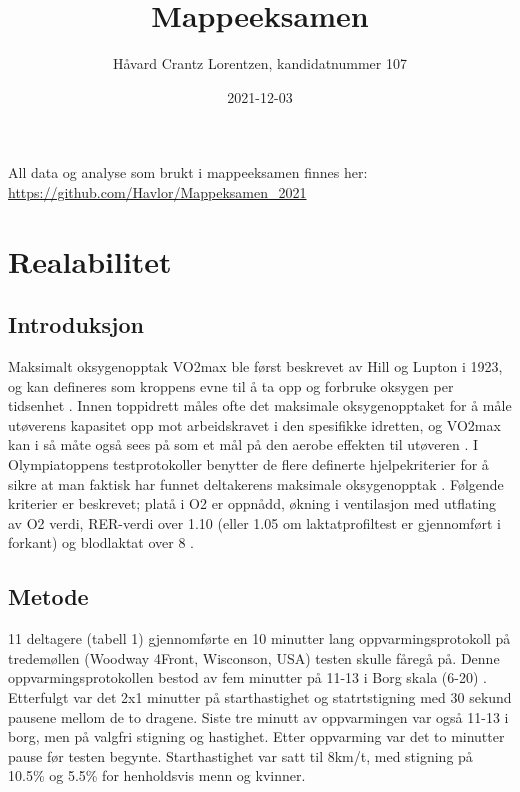\documentclass[
]{book}
\title{Mappeeksamen}
\author{Håvard Crantz Lorentzen, kandidatnummer 107}
\date{2021-12-03}
\begin{document}
\maketitle

{
\setcounter{tocdepth}{1}
\tableofcontents
}
All data og analyse som brukt i mappeeksamen finnes her: \url{https://github.com/Havlor/Mappeksamen_2021}

\hypertarget{realabilitet}{%
\chapter{Realabilitet}\label{realabilitet}}

\hypertarget{introduksjon}{%
\section{Introduksjon}\label{introduksjon}}

Maksimalt oksygenopptak VO2max ble først beskrevet av Hill og Lupton i 1923, og kan defineres som kroppens evne til å ta opp og forbruke oksygen per tidsenhet \citep{bassett2000, hill1923}. Innen toppidrett måles ofte det maksimale oksygenopptaket for å måle utøverens kapasitet opp mot arbeidskravet i den spesifikke idretten, og VO2max kan i så måte også sees på som et mål på den aerobe effekten til utøveren \citep{bassett2000}. I Olympiatoppens testprotokoller benytter de flere definerte hjelpekriterier for å sikre at man faktisk har funnet deltakerens maksimale oksygenopptak \citep{tønnessen2017}. Følgende kriterier er beskrevet; platå i O2 er oppnådd, økning i ventilasjon med utflating av O2 verdi, RER-verdi over 1.10 (eller 1.05 om laktatprofiltest er gjennomført i forkant) og blodlaktat over 8 \citep{tønnessen2017}.

\hypertarget{metode}{%
\section{Metode}\label{metode}}

11 deltagere (tabell 1) gjennomførte en 10 minutter lang oppvarmingsprotokoll på tredemøllen (Woodway 4Front, Wisconson, USA) testen skulle fåregå på. Denne oppvarmingsprotokollen bestod av fem minutter på 11-13 i Borg skala (6-20) \citep{borg1982}. Etterfulgt var det 2x1 minutter på starthastighet og statrtstigning med 30 sekund pausene mellom de to dragene. Siste tre minutt av oppvarmingen var også 11-13 i borg, men på valgfri stigning og hastighet. Etter oppvarming var det to minutter pause før testen begynte. Starthastighet var satt til 8km/t, med stigning på 10.5\% og 5.5\% for henholdsvis menn og kvinner.
\end{document}
